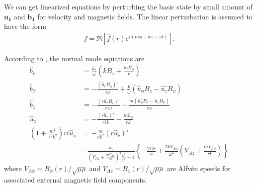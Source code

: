 \documentclass{jfm}
\newcommand{\del}{\nabla}
\begin{document}
We can get linearized equations by perturbing the basic state by small amount
of $\mathbf{u_1}$ and $\mathbf{b_1}$ for velocity and magnetic fields.
The linear perturbation is assumed to have the form
\begin{align}
    f=\Re\left[\hat{f}(r)e^{i(m\phi+kz+\omega t)} \right].
\end{align}

According to \cite{Acheson1972}, the normal mode equations are
\begin{align}
    \hat{b}_r &=\frac{\hat{u}_r}{\omega}\left(k B_z +\frac{m B_\phi}{r}\right) \\
    \hat{b}_\phi &= -\frac{(\hat{u}_r B_\phi)'}{i\omega} +\frac{k}{\omega}(\hat{u}_\phi B_z -\hat{u_z}B_\phi) \\
    \hat{b}_z &= -\frac{(r\hat{u}_r B_z)'}{ri\omega} - \frac{m(\hat{u_\phi} B_z - \hat{u}_z B_\phi)}{r\omega} \\
    \hat{u}_z &= -\frac{(r\hat{u}_r)'}{rik}-\frac{m\hat{u}_\phi}{rk} \\
    \left(1+\frac{m^2}{r^2k^2}\right)ri\hat{u}_\phi &= -\frac{m}{rk^2}(r\hat{u}_r)' \nonumber \\ &-\frac{\hat{u}_r}{\left(V_{Az}+\frac{m V_{A\phi}}{rk}\right)^2\frac{k^2}{\omega^2}-1}
    \left\{-\frac{2\Omega r}{\omega}+\frac{2kV_{A\phi}}{\omega^2}\left(V_{Az}+\frac{mV_{A\phi}}{rk}\right)\right\}
\end{align}
where $V_{A\phi}=B_\phi (r) / \sqrt{\mu \rho}$ and  $V_{Az}=B_z (r) / \sqrt{\mu \rho}$ 
are Alfv\'en speeds for associated external magnetic field components.
\end{document}
